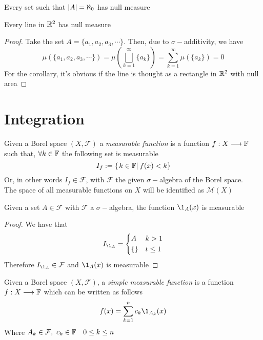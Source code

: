 \documentclass[../complete.tex]{subfiles}
\begin{document}
\begin{thm}
	Every set such that $\abs{A}=\aleph_0$ has null measure
\end{thm}
\begin{cor}
	Every line in $\mathbb{R}^2$ has null measure
\end{cor}
\begin{proof}
	Take the set $A=\{a_1,a_2,a_3,\cdots\}$. Then, due to $\sigma-$additivity, we have
	\begin{equation}
		\mu\left( \{a_1,a_2,a_3,\cdots\} \right)=\mu\left( \bigsqcup_{k=1}^\infty\{a_k\} \right)=\sum_{k=1}^\infty\mu\left( \{a_k\} \right)=0
		\label{eq:sigmaddproof}
	\end{equation}
	For the corollary, it's obvious if the line is thought as a rectangle in $\mathbb{R}^2$ with null area
\end{proof}
\section{Integration}
\begin{dfn}
	Given a Borel space $(X,\mathcal{F})$ a \textit{measurable function} is a function $f:X\overset{}{\longrightarrow}\mathbb{F}$ such that, $\forall k\in\mathbb{F}$ the following set is measurable
	\begin{equation}
		I_f:=\left\{\left.k\in\mathbb{F}\right|_{}f(x)<k \right\}
		\label{eq:fmesset}
	\end{equation}
	Or, in other words $I_f\in\mathcal{F}$, with $\mathcal{F}$ the given $\sigma-$algebra of the Borel space.\\
	The space of all measurable functions on $X$ will be identified as $\mathcal{M}(X)$
\end{dfn}
\begin{thm}
	Given a set $A\in\mathcal{F}$ with $\mathcal{F}$ a $\sigma-$algebra, the function $\1_A(x)$ is measurable
\end{thm}
\begin{proof}
	We have that
	\begin{equation*}
		I_{\1_A}=\begin{dcases}A&k>1\\ \{\}&t\le1\end{dcases}
	\end{equation*}
	Therefore $I_{\1_A}\in\mathcal{F}$ and $\1_A(x)$ is measurable
\end{proof}
\begin{dfn}
	Given a Borel space $(X,\mathcal{F})$, a \textit{simple measurable function} is a function $f:X\overset{}{\longrightarrow}\mathbb{F}$ which can be written as follows
	\begin{equation}
		f(x)=\sum_{k=1}^nc_k\1_{A_k}(x)
		\label{eq:simplemef}
	\end{equation}
	Where $A_k\in\mathcal{F},\ c_k\in\mathbb{F}\quad 0\le k\le n$
\end{dfn}
\end{document}
